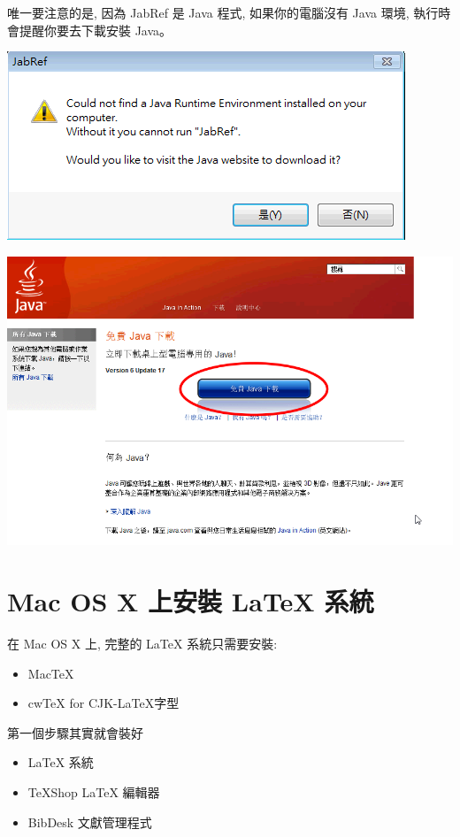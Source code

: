 \documentclass[12pt]{report}
\begin{document}
唯一要注意的是, 因為 JabRef 是 Java 程式, 如果你的電腦沒有 Java 環境, 執行時會提醒你要去下載安裝 Java。

\begin{center}
\includegraphics[scale=0.5]{windows_java.png}
\end{center}

\begin{center}
\includegraphics[scale=0.4]{windows_javadownload.png}
\end{center}

\chapter{Mac OS X 上安裝 \LaTeX{} 系統}
在 Mac OS X 上, 完整的 \LaTeX{} 系統只需要安裝:

\begin{itemize}
\item MacTeX
\item cw\TeX{} for CJK-\LaTeX 字型
\end{itemize}

第一個步驟其實就會裝好

\begin{itemize}
\item \LaTeX{} 系統
\item TeXShop \LaTeX{} 編輯器
\item BibDesk 文獻管理程式
\end{itemize}
\end{document}
